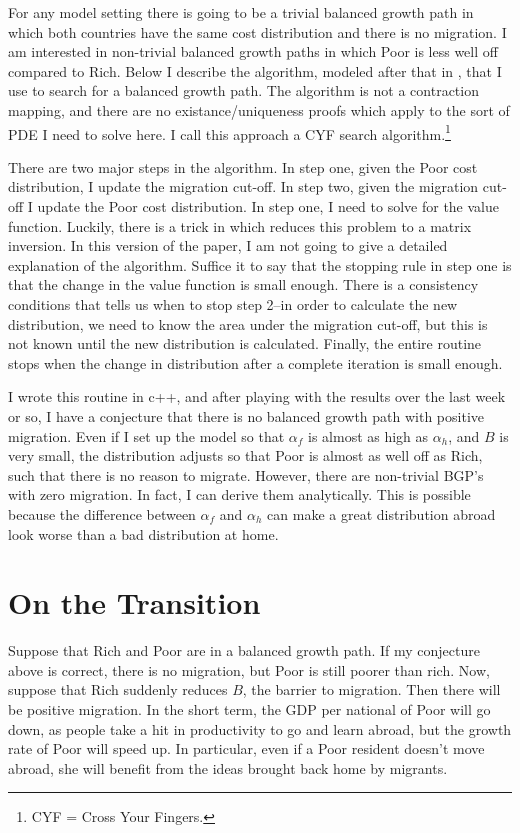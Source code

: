 \documentclass[12pt]{article}
\begin{document}
For any model setting there is going to be a trivial balanced growth path in which both countries have the same cost distribution and there is no migration.  I am interested in non-trivial balanced growth paths in which Poor is less well off compared to Rich.
Below I describe the algorithm, modeled after that in \citet{LucasMoll2012}, that I use to search for a balanced growth path.  The algorithm is not a contraction mapping, and there are no existance/uniqueness proofs which apply to the sort of PDE I need to solve here.  I call this approach a CYF search algorithm.\footnote{CYF = Cross Your Fingers.} 

There are two major steps in the algorithm.  In step one, given the Poor cost distribution, I update the migration cut-off.  In step two, given the migration cut-off I update the Poor cost distribution.  In step one, I need to solve for the value function.  Luckily, there is a trick in \citet{LucasMoll2012} which reduces this problem to a matrix inversion.  In this version of the paper, I am not going to give a detailed explanation of the algorithm.  Suffice it to say that the stopping rule in step one is that the change in the value function is small enough.  There is a consistency conditions that tells us when to stop step 2--in order to calculate the new distribution, we need to know the area under the migration cut-off, but this is not known until the new distribution is calculated.  Finally, the entire routine stops when the change in distribution after a complete iteration is small enough.

I wrote this routine in c++, and after playing with the results over the last week or so, I have a conjecture that there is no balanced growth path with positive migration.  Even if I set up the model so that $\alpha_f$ is almost as high as $\alpha_h$, and $B$ is very small, the distribution adjusts so that Poor is almost as well off as Rich, such that there is no reason to migrate.  However, there are non-trivial BGP's with zero migration.  In fact, I can derive them analytically. This is possible because the difference between $\alpha_f$ and $\alpha_h$ can make a great distribution abroad look worse than a bad distribution at home.
\section{On the Transition}


Suppose that Rich and Poor are in a balanced growth path.  If my conjecture above is correct, there is no migration, but Poor is still poorer than rich.  Now, suppose that Rich suddenly reduces $B$, the barrier to migration.  Then there will be positive migration.  In the short term, the GDP per national of Poor will go down, as people take a hit in productivity to go and learn abroad, but the growth rate of Poor will speed up.  In particular, even if a Poor resident doesn't move abroad, she will benefit from the ideas brought back home by migrants.
\end{document}
